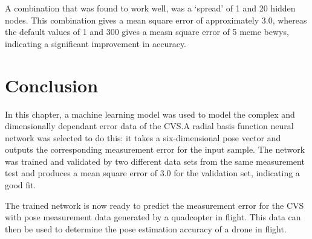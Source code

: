 A combination that was found to work well, was a `spread' of 1 and 20 hidden nodes. This combination gives a mean square error of approximately 3.0, whereas the default values of 1 and 300 gives a measn square error of 5 meme bewys, indicating a significant improvement in accuracy.  

\section{Conclusion}

In this chapter, a machine learning model was used to model the complex and dimensionally dependant error data of the CVS.\@ A radial basis function neural network was selected to do this: it takes a six-dimensional pose vector and outputs the corresponding measurement error for the input sample. The network was trained and validated by two different data sets from the same measurement test and produces a mean square error of 3.0 for the validation set, indicating a good fit. 

The trained network is now ready to predict the measurement error for the CVS with pose measurement data generated by a quadcopter in flight. This data can then be used to determine the pose estimation accuracy of a drone in flight. 

